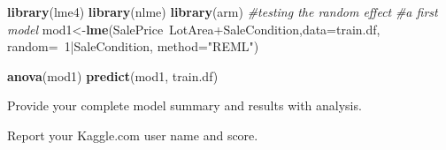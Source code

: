 \documentclass[]{article}
\newenvironment{Shaded}{\begin{snugshade}}{\end{snugshade}}
\newcommand{\KeywordTok}[1]{\textcolor[rgb]{0.13,0.29,0.53}{\textbf{{#1}}}}
\newcommand{\DataTypeTok}[1]{\textcolor[rgb]{0.13,0.29,0.53}{{#1}}}
\newcommand{\DecValTok}[1]{\textcolor[rgb]{0.00,0.00,0.81}{{#1}}}
\newcommand{\StringTok}[1]{\textcolor[rgb]{0.31,0.60,0.02}{{#1}}}
\newcommand{\CommentTok}[1]{\textcolor[rgb]{0.56,0.35,0.01}{\textit{{#1}}}}
\newcommand{\NormalTok}[1]{{#1}}
\begin{document}
\begin{Shaded}
\begin{Highlighting}[]
\KeywordTok{library}\NormalTok{(lme4)}
\KeywordTok{library}\NormalTok{(nlme)}
\KeywordTok{library}\NormalTok{(arm)}
\CommentTok{#testing the random effect}
\CommentTok{#a first model}
\NormalTok{mod1<-}\KeywordTok{lme}\NormalTok{(SalePrice~LotArea+SaleCondition,}\DataTypeTok{data=}\NormalTok{train.df, }\DataTypeTok{random=}\NormalTok{~}\DecValTok{1}\NormalTok{|SaleCondition, }\DataTypeTok{method=}\StringTok{"REML"}\NormalTok{)}

\KeywordTok{anova}\NormalTok{(mod1)}
\KeywordTok{predict}\NormalTok{(mod1, train.df)}
\end{Highlighting}
\end{Shaded}

Provide your complete model summary and results with analysis.

Report your Kaggle.com user name and score.
\end{document}
